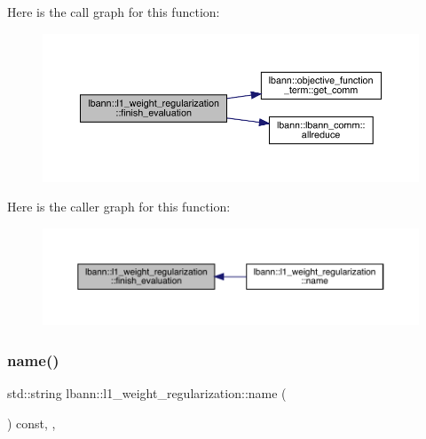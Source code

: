 Here is the call graph for this function\+:\nopagebreak
\begin{figure}[H]
\begin{center}
\leavevmode
\includegraphics[width=350pt]{classlbann_1_1l1__weight__regularization_a5416b0c884e45854a03e0d2e2b3e63f3_cgraph}
\end{center}
\end{figure}
Here is the caller graph for this function\+:\nopagebreak
\begin{figure}[H]
\begin{center}
\leavevmode
\includegraphics[width=350pt]{classlbann_1_1l1__weight__regularization_a5416b0c884e45854a03e0d2e2b3e63f3_icgraph}
\end{center}
\end{figure}
\mbox{\label{classlbann_1_1l1__weight__regularization_a4a41b6a07c36fc4f82364295a404ba1b}} 
\subsubsection{\texorpdfstring{name()}{name()}}
{\footnotesize\ttfamily std\+::string lbann\+::l1\+\_\+weight\+\_\+regularization\+::name (\begin{DoxyParamCaption}{ }\end{DoxyParamCaption}) const\hspace{0.3cm}{\ttfamily [inline]}, {\ttfamily [override]}, {\ttfamily [virtual]}}

